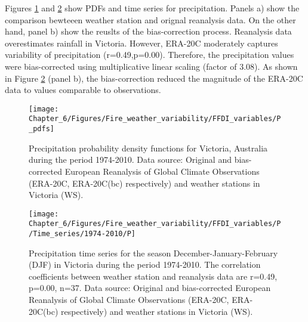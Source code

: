 Figures \ref{fig: Precipitation probability density functions for Victoria, Australia during the period 1974-2010 (r)}
and \ref{fig:Precipitation time series for the season December-January-February in Victoria during the period 1974-2010}
show PDFs and time series for precipitation. Panels a) show the comparison
bewteeen weather station and orignal reanalysis data. On the other
hand, panel b) show the reuslts of the bias-correction process. Reanalysis
data overestimates rainfall in Victoria. However, ERA-20C moderately
captures variability of precipitation (r=0.49,p=0.00). Therefore,
the precipitation values were bias-corrected using multiplicative
linear scaling (factor of 3.08). As shown in Figure \ref{fig:Precipitation time series for the season December-January-February in Victoria during the period 1974-2010}
(panel b), the bias-correction reduced the magnitude of the ERA-20C
data to values comparable to observations. 

\begin{figure}[h]
\noindent \begin{centering}
\texttt{[image: Chapter\_6/Figures/Fire\_weather\_variability/FFDI\_variables/P\_pdfs]}
\par\end{centering}

\caption[Precipitation probability density functions for Victoria, Australia
during the period 1974-2010]{Precipitation probability density functions for Victoria, Australia
during the period 1974-2010. Data source: Original and bias-corrected
European Reanalysis of Global Climate Observations (ERA-20C, ERA-20C(bc)
respectively) and weather stations in Victoria (WS). \label{fig: Precipitation probability density functions for Victoria, Australia during the period 1974-2010 (r)}}
\end{figure}


\begin{figure}[h]
\noindent \begin{centering}
\texttt{[image: Chapter\_6/Figures/Fire\_weather\_variability/FFDI\_variables/P/Time\_series/1974-2010/P]}
\par\end{centering}

\caption[Precipitation time series for the season December-January-February
(DJF) in Victoria during the period 1974-2010]{Precipitation time series for the season December-January-February
(DJF) in Victoria during the period 1974-2010. The correlation coefficients
between weather station and reanalysis data are r=0.49, p=0.00, n=37.
Data source: Original and bias-corrected European Reanalysis of Global
Climate Observations (ERA-20C, ERA-20C(bc) respectively) and weather
stations in Victoria (WS). \label{fig:Precipitation time series for the season December-January-February in Victoria during the period 1974-2010}}


\end{figure}



